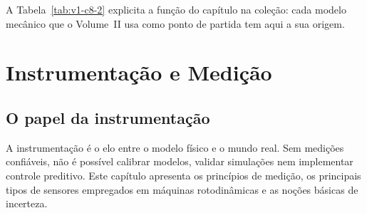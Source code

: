 \documentclass[12pt,a4paper]{article}
\numberwithin{equation}{section}
\numberwithin{table}{section}
\numberwithin{figure}{section}
\begin{document}
A Tabela~\ref{tab:v1-c8-2} explicita a função do capítulo na coleção: cada
modelo mecânico que o Volume~II usa como ponto de partida tem aqui a sua
origem.

\begin{table}[H]
\centering
\caption[Ligação com o Volume II]{Correspondência entre os fundamentos deste
capítulo e os modelos mecânicos do Volume II.}
\label{tab:v1-c8-2}
\small
{}
\end{table}


\section{Instrumentação e Medição}\label{sec:instrumentacao}

\subsection{O papel da instrumentação}

A instrumentação é o elo entre o modelo físico e o mundo real. Sem medições
confiáveis, não é possível calibrar modelos, validar simulações nem implementar
controle preditivo. Este capítulo apresenta os princípios de medição, os
principais tipos de sensores empregados em máquinas rotodinâmicas e as
noções básicas de incerteza.
\end{document}
